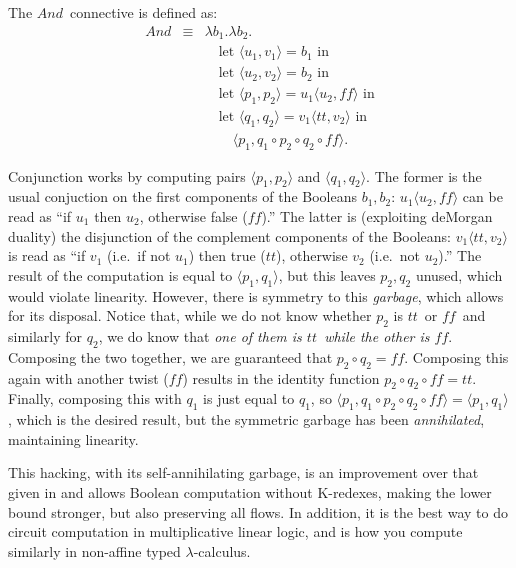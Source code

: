 \documentclass{llncs}
\newcommand\TT{\ensuremath{\mathit{tt}}}
\newcommand\FF{\ensuremath{\mathit{ff}}}
\newcommand\And{\ensuremath{\mathit{And}}}
\begin{document}
The \And\ connective is defined as:
\begin{displaymath}
\begin{array}{rcl}
\And & \equiv & \lambda b_1.\lambda b_2.\\
\ & \ & \quad\mbox{let }\langle u_1,v_1\rangle = b_1\mbox{ in}\\
\ & \ & \quad\mbox{let }\langle u_2,v_2\rangle = b_2\mbox{ in}\\
\ & \ & \quad\mbox{let }\langle p_1,p_2\rangle = u_1\langle u_2, \FF\rangle \mbox{ in}\\
\ & \ & \quad\mbox{let }\langle q_1,q_2\rangle = v_1\langle \TT, v_2\rangle \mbox{ in}\\
\ & \ & \qquad\langle p_1, q_1 \circ p_2 \circ q_2 \circ \FF \rangle.
\end{array}
\end{displaymath}

Conjunction works by computing pairs $\langle p_1,p_2\rangle$ and
$\langle q_1,q_2\rangle$.  The former is the usual conjuction on the
first components of the Booleans $b_1,b_2$: $u_1\langle u_2,
\FF\rangle$ can be read as ``if $u_1$ then $u_2$, otherwise false
(\FF).''  The latter is (exploiting deMorgan duality) the disjunction of
the complement components of the Booleans: $v_1\langle\TT,v_2\rangle$
is read as ``if $v_1$ (i.e.~if not $u_1$) then true (\TT), otherwise
$v_2$ (i.e.~not $u_2$).''  The result of the computation is equal to
$\langle p_1,q_1\rangle$, but this leaves $p_2,q_2$ unused, which
would violate linearity.  However, there is symmetry to this {\em
garbage}, which allows for its disposal.  Notice that, while we do not
know whether $p_2$ is \TT\ or \FF\ and similarly for $q_2$, we do know
that {\em one of them is \TT\ while the other is \FF}.  Composing the
two together, we are guaranteed that $p_2 \circ q_2 = \FF$.  Composing
this again with another twist (\FF) results in the identity function
$p_2 \circ q_2 \circ \FF = \TT$.  Finally, composing this with $q_1$
is just equal to $q_1$, so $\langle p_1, q_1 \circ p_2 \circ q_2 \circ
\FF \rangle = \langle p_1, q_1\rangle$, which is the desired result,
but the symmetric garbage has been {\em annihilated}, maintaining
linearity.

This hacking, with its self-annihilating garbage, is an improvement
over that given in \cite{mairson-jfp04} and allows Boolean computation
without K-redexes, making the lower bound stronger, but also
preserving all flows.  In addition, it is the best way to do circuit
computation in multiplicative linear logic, and is how you compute
similarly in non-affine typed $\lambda$-calculus.
\end{document}
